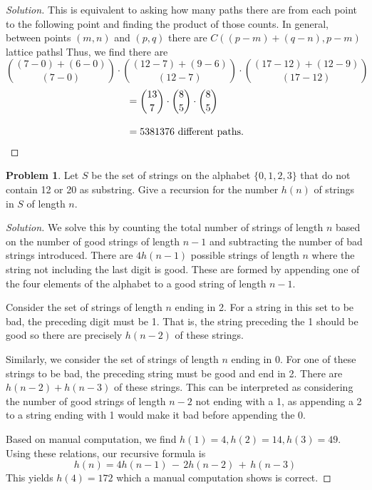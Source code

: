 \documentclass[12pt]{article}
\theoremstyle{definition}
\newtheorem{problem-internal}{Problem}[]
\newenvironment{problem}{
  \medskip
  \begin{problem-internal}
}{
\end{problem-internal}
}
\newenvironment{solution}{
  \begin{proof}[Solution]
    \vspace{-8px}
    \setlength{\parskip}{4px}
    \setlength{\parindent}{0px}
}{
\end{proof}
}
\begin{document}
  \begin{solution}
    This is equivalent to asking how many paths there are from each point to the following point and finding the product of those counts. In general, between points $(m, n)$ and $(p, q)$ there are $C((p-m)+(q-n), p-m)$ lattice pathsl Thus, we find there are
    \[{(7 - 0) + (6 - 0) \choose (7 - 0)} \cdot {(12 - 7) + (9 - 6) \choose (12 - 7)} \cdot {(17 - 12) + (12 - 9) \choose (17 - 12)} \]
    \[
    \begin{split}
      & = {13 \choose 7} \cdot {8 \choose 5} \cdot {8 \choose 5} \\[2ex]
      & = 5381376 \text{ different paths.} \qedhere
    \end{split}
    \]
  \end{solution}

  \begin{problem}
    Let $S$ be the set of strings on the alphabet $\{0, 1, 2, 3\}$ that do not contain 12 or 20 as substring. Give a recursion for the number $h(n)$ of strings in $S$ of length $n$.
  \end{problem}

  \begin{solution}
    We solve this by counting the total number of strings of length \(n\) based on the number of good strings of length \(n-1\) and subtracting the number of bad strings introduced. There are \(4h(n-1)\) possible strings of length \(n\) where the string not including the last digit is good. These are formed by appending one of the four elements of the alphabet to a good string of length \(n-1\).

    Consider the set of strings of length \(n\) ending in 2. For a string in this set to be bad, the preceding digit must be 1. That is, the string preceding the 1 should be good so there are precisely \(h(n-2)\) of these strings.

    Similarly, we consider the set of strings of length \(n\) ending in 0. For one of these strings to be bad, the preceding string must be good and end in 2. There are \(h(n-2) + h(n-3)\) of these strings. This can be interpreted as considering the number of good strings of length \(n-2\) not ending with a 1, as appending a 2 to a string ending with 1 would make it bad before appending the 0.

    Based on manual computation, we find \(h(1) = 4, h(2) = 14, h(3) = 49\). Using these relations, our recursive formula is
    \[h(n) = 4h(n-1) \, - \, 2h(n-2) \, + \, h(n-3) \]
    This yields \(h(4) = 172\) which a manual computation shows is correct.
  \end{solution}
\end{document}
